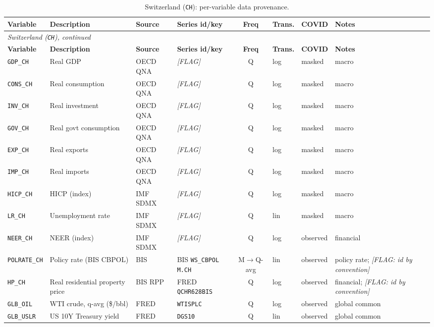 {\small
\begin{longtable}{@{}lp{2.9cm}p{1.9cm}p{2.0cm}cp{1.4cm}p{1.7cm}p{2.6cm}@{}}
\caption{Switzerland (\texttt{CH}): per-variable data provenance.}\label{tab:data:CH}\\
\toprule
\textbf{Variable} & \textbf{Description} & \textbf{Source} & \textbf{Series id/key} & \textbf{Freq} & \textbf{Trans.} & \textbf{COVID} & \textbf{Notes}\\
\midrule
\endfirsthead
\multicolumn{8}{l}{\small\itshape Switzerland (\texttt{CH}), continued}\\
\toprule
\textbf{Variable} & \textbf{Description} & \textbf{Source} & \textbf{Series id/key} & \textbf{Freq} & \textbf{Trans.} & \textbf{COVID} & \textbf{Notes}\\
\midrule
\endhead
\bottomrule
\endfoot
\texttt{GDP\_CH} & Real GDP & OECD QNA & \textit{[FLAG]} & Q & log & masked & macro\\
\texttt{CONS\_CH} & Real consumption & OECD QNA & \textit{[FLAG]} & Q & log & masked & macro\\
\texttt{INV\_CH} & Real investment & OECD QNA & \textit{[FLAG]} & Q & log & masked & macro\\
\texttt{GOV\_CH} & Real govt consumption & OECD QNA & \textit{[FLAG]} & Q & log & masked & macro\\
\texttt{EXP\_CH} & Real exports & OECD QNA & \textit{[FLAG]} & Q & log & masked & macro\\
\texttt{IMP\_CH} & Real imports & OECD QNA & \textit{[FLAG]} & Q & log & masked & macro\\
\texttt{HICP\_CH} & HICP (index) & IMF SDMX & \textit{[FLAG]} & Q & log & masked & macro\\
\texttt{LR\_CH} & Unemployment rate & IMF SDMX & \textit{[FLAG]} & Q & lin & masked & macro\\
\texttt{NEER\_CH} & NEER (index) & IMF SDMX & \textit{[FLAG]} & Q & log & observed & financial\\
\texttt{POLRATE\_CH} & Policy rate (BIS CBPOL) & BIS & BIS \texttt{WS\_CBPOL} \texttt{M.CH} & M$\to$Q-avg & lin & observed & policy rate; \textit{[FLAG: id by convention]}\\
\texttt{HP\_CH} & Real residential property price & BIS RPP & FRED \texttt{QCHR628BIS} & Q & log & observed & financial; \textit{[FLAG: id by convention]}\\
\texttt{GLB\_OIL} & WTI crude, q-avg (\$/bbl) & FRED & \texttt{WTISPLC} & Q & log & observed & global common\\
\texttt{GLB\_USLR} & US 10Y Treasury yield & FRED & \texttt{DGS10} & Q & lin & observed & global common\\

\end{longtable}}
